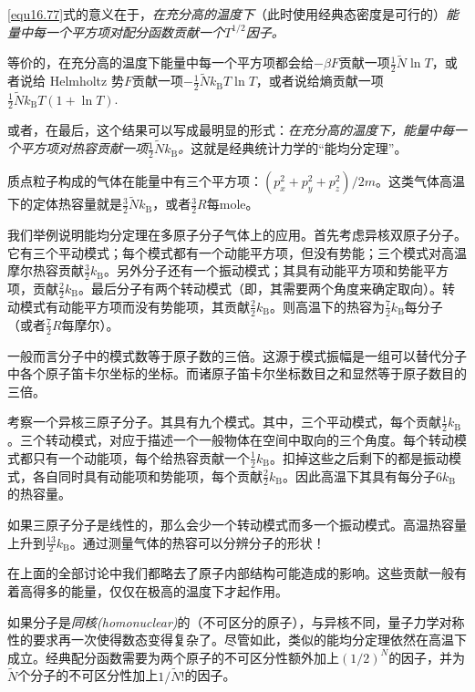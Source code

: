 \eqref{equ16.77}式的意义在于，{\it 在充分高的温度下}（此时使用经典态密度是可行的）{\it 能量中每一个平方项对配分函数贡献一个$T^{1/2}$因子。}

等价的，在充分高的温度下能量中每一个平方项都会给$-\beta F$贡献一项$\frac{1}{2}\tilde N\ln T$，或者说给 Helmholtz 势$F$贡献一项$-\frac{1}{2}\tilde Nk_\text{B}T\ln T$，或者说给熵贡献一项$\frac{1}{2}\tilde Nk_\text{B}T(1+\ln T)$.

或者，在最后，这个结果可以写成最明显的形式：{\it 在充分高的温度下，能量中每一个平方项对热容贡献一项$\frac{1}{2}\tilde Nk_\text{B}$。}这就是经典统计力学的``能均分定理''。

质点粒子构成的气体在能量中有三个平方项：$(p_x^2+p_y^2+p_z^2)/2m$。这类气体高温下的定体热容量就是$\frac{3}{2}\tilde Nk_\text{B}$，或者$\frac{3}{2}R$每mole。

我们举例说明能均分定理在多原子分子气体上的应用。首先考虑异核双原子分子。它有三个平动模式；每个模式都有一个动能平方项，但没有势能；三个模式对高温摩尔热容贡献$\frac{3}{2}k_\text{B}$。另外分子还有一个振动模式；其具有动能平方项和势能平方项，贡献$\frac{2}{2}k_\text{B}$。最后分子有两个转动模式（即，其需要两个角度来确定取向）。转动模式有动能平方项而没有势能项，其贡献$\frac{2}{2}k_\text{B}$。则高温下的热容为$\frac{7}{2}k_\text{B}$每分子（或者$\frac{7}{2}R$每摩尔）。

一般而言分子中的模式数等于原子数的三倍。这源于模式振幅是一组可以替代分子中各个原子笛卡尔坐标的坐标。而诸原子笛卡尔坐标数目之和显然等于原子数目的三倍。

考察一个异核三原子分子。其具有九个模式。其中，三个平动模式，每个贡献$\frac{1}{2}k_\text{B}$。三个转动模式，对应于描述一个一般物体在空间中取向的三个角度。每个转动模式都只有一个动能项，每个给热容贡献一个$\frac{1}{2}k_\text{B}$。扣掉这些之后剩下的都是振动模式，各自同时具有动能项和势能项，每个贡献$\frac{2}{2}k_\text{B}$。因此高温下其具有每分子$6k_\text{B}$的热容量。

如果三原子分子是线性的，那么会少一个转动模式而多一个振动模式。高温热容量上升到$\frac{13}{2}k_\text{B}$。通过测量气体的热容可以分辨分子的形状！

在上面的全部讨论中我们都略去了原子内部结构可能造成的影响。这些贡献一般有着高得多的能量，仅仅在极高的温度下才起作用。

如果分子是{\it 同核(homonuclear)}的（不可区分的原子），与异核不同，量子力学对称性的要求再一次使得数态变得复杂了。尽管如此，类似的能均分定理依然在高温下成立。经典配分函数需要为两个原子的不可区分性额外加上$(1/2)^N$的因子，并为$\tilde N$个分子的不可区分性加上$1/\tilde N!$的因子。